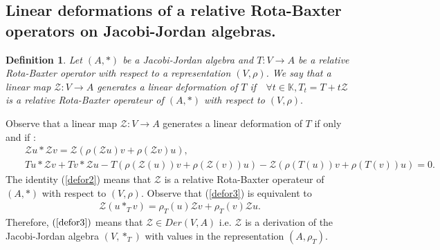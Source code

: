 \documentclass[12pt]{amsart}
\newtheorem{definition}[Theorem]{Definition}
\begin{document}
	\subsection{Linear deformations of a relative Rota-Baxter operators on Jacobi-Jordan algebras.}
	\begin{definition}
		Let $(A,\ast)$ be a Jacobi-Jordan algebra and $ T:V\rightarrow A $ be a relative Rota-Baxter operator with respect to a representation $(V,\rho)$. We say that a linear map  $\mathcal{Z}:V\rightarrow A$ generates a linear deformation of $T$  if \,\  
		 $\forall  t \in \mathbb{K},T_{t}=T+t\mathcal{Z}$ is a relative Rota-Baxter  operateur of $(A,\ast)$ with respect to $(V,\rho).$
	\end{definition}
	Observe that a linear map $ \mathcal{Z}:V\rightarrow A $ generates a linear deformation of $T$ if only and if : 
	\begin{eqnarray}
		&&\mathcal{Z}u \ast \mathcal{Z}v= \mathcal{Z}(\rho(\mathcal{Z}u)v+\rho(\mathcal{Z}v)u),\label{defor2}\\
		&& Tu\ast \mathcal{Z}v + Tv\ast \mathcal{Z}u-T(\rho(\mathcal{Z}(u))v+\rho(\mathcal{Z}(v))u)-\mathcal{Z}(\rho(T(u))v+\rho(T(v))u)
		=0.\label{defor3}
	\end{eqnarray}
	The identity (\ref{defor2}) means that $\mathcal{Z}$ is a relative Rota-Baxter operateur of $(A,\ast)$ with respect to $(V,\rho).$ Observe that (\ref{defor3}) is equivalent to
	\begin{eqnarray*}
		\mathcal{Z}(u\ast_Tv)=\rho_T(u)\mathcal{Z}v+\rho_T(v)\mathcal{Z}u.
	\end{eqnarray*}
	Therefore,  $(\ref{defor3})$ means that $\mathcal{Z}\in Der(V,A)$ i.e. $\mathcal{Z}$ is a derivation of the Jacobi-Jordan algebra $(V,\ast_T)$ with values in the representation $(A,\rho_T).$
	
\end{document}

